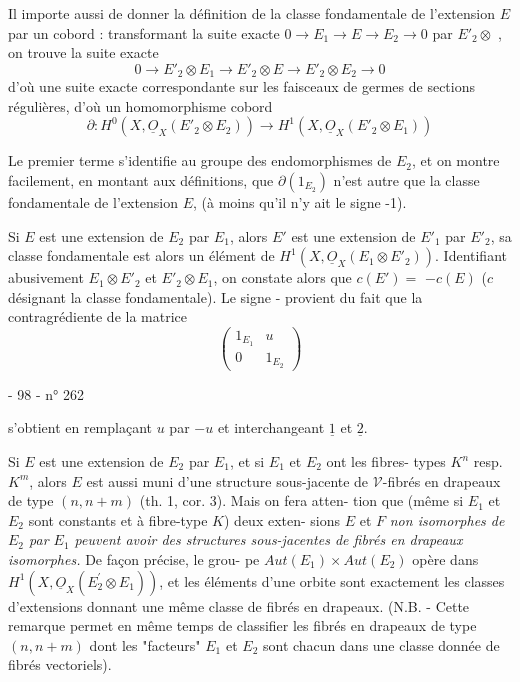 Il importe aussi de donner la définition de la classe fondamentale
de l'extension $E$ par un cobord : transformant la suite exacte
$0 \rightarrow E_1 \rightarrow E \rightarrow E_2 \rightarrow 0$ par $E'_2 \otimes$ , on trouve la suite exacte
$$0 \rightarrow E'_2 \otimes E_1 \rightarrow E'_2 \otimes E \rightarrow E'_2 \otimes E_2 \rightarrow 0$$
d'où une suite exacte correspondante sur les faisceaux de germes de
sections régulières, d'où un homomorphisme cobord
$$\partial : H^0(X,\underline{O}_X(E'_2 \otimes E_2)) \rightarrow H^1(X,\underline{O}_X(E'_2 \otimes E_1))$$

Le premier terme s'identifie au groupe des endomorphismes de $E_2$, et on
montre facilement, en montant aux définitions, que $\partial(1_{E_2})$ n'est autre
que la classe fondamentale de l'extension $E$, (à moins qu'il n'y ait le
signe -1).

Si $E$ est une extension de $E_2$ par $E_1$, alors $E'$ est une extension de
$E'_1$ par $E'_2$, sa classe fondamentale est alors un élément de $H^1(X,\underline{O}_X(E_1 \otimes E'_2))$.
Identifiant abusivement $E_1 \otimes E'_2$ et $E'_2 \otimes E_1$, on constate alors que $c(E') =$
$- c(E)$ \quad ($c$ désignant la classe fondamentale). Le signe - provient du
fait que la contragrédiente de la matrice
$$
\begin{pmatrix}
1_{E_1} & u \\
0 & 1_{E_2}
\end{pmatrix}
$$

\newpage


\begin{center}
- 98 - \hfill n° 262
\end{center}

s'obtient en remplaçant $u$ par $-u$ et interchangeant $\underline{1}$ et $\underline{2}$.

Si $E$ est une extension de $E_2$ par $E_1$, et si $E_1$ et $E_2$ ont les fibres-
types $K^n$ resp. $K^m$, alors $E$ est aussi muni d'une structure sous-jacente de
$\mathcal{V}$-fibrés en drapeaux de type $(n, n+m)$ (th. 1, cor. 3). Mais on fera atten-
tion que (même si $E_1$ et $E_2$ sont constants et à fibre-type $K$) deux exten-
sions $E$ et $F$ \emph{non isomorphes de $E_2$ par $E_1$ peuvent avoir des structures
sous-jacentes de fibrés en drapeaux isomorphes.} De façon précise, le grou-
pe $Aut(E_1) \times Aut(E_2)$ opère dans $H^1(X, \underline{O}_X(E_2^\prime \otimes E_1))$, et les éléments d'une
orbite sont exactement les classes d'extensions donnant une même classe
de fibrés en drapeaux. (N.B. - Cette remarque permet en même temps de
classifier les fibrés en drapeaux de type $(n, n+m)$ dont les "facteurs" $E_1$
et $E_2$ sont chacun dans une classe donnée de fibrés vectoriels).

